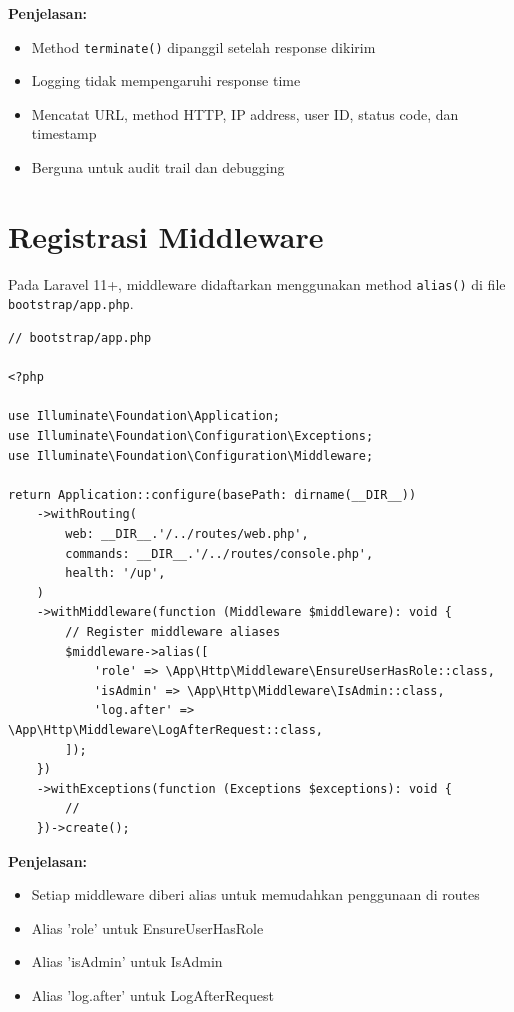 \documentclass[a4paper,oneside,11pt]{book}
\begin{document}
\textbf{Penjelasan:}
\begin{itemize}
    \item Method \texttt{terminate()} dipanggil setelah response dikirim
    \item Logging tidak mempengaruhi response time
    \item Mencatat URL, method HTTP, IP address, user ID, status code, dan timestamp
    \item Berguna untuk audit trail dan debugging
\end{itemize}

\section{Registrasi Middleware}

Pada Laravel 11+, middleware didaftarkan menggunakan method \texttt{alias()} di file \texttt{bootstrap/app.php}.

\begin{lstlisting}[style=phpstyle]
// bootstrap/app.php

<?php

use Illuminate\Foundation\Application;
use Illuminate\Foundation\Configuration\Exceptions;
use Illuminate\Foundation\Configuration\Middleware;

return Application::configure(basePath: dirname(__DIR__))
    ->withRouting(
        web: __DIR__.'/../routes/web.php',
        commands: __DIR__.'/../routes/console.php',
        health: '/up',
    )
    ->withMiddleware(function (Middleware $middleware): void {
        // Register middleware aliases
        $middleware->alias([
            'role' => \App\Http\Middleware\EnsureUserHasRole::class,
            'isAdmin' => \App\Http\Middleware\IsAdmin::class,
            'log.after' => \App\Http\Middleware\LogAfterRequest::class,
        ]);
    })
    ->withExceptions(function (Exceptions $exceptions): void {
        //
    })->create();
\end{lstlisting}

\textbf{Penjelasan:}
\begin{itemize}
    \item Setiap middleware diberi alias untuk memudahkan penggunaan di routes
    \item Alias 'role' untuk EnsureUserHasRole
    \item Alias 'isAdmin' untuk IsAdmin
    \item Alias 'log.after' untuk LogAfterRequest
\end{itemize}
\end{document}
